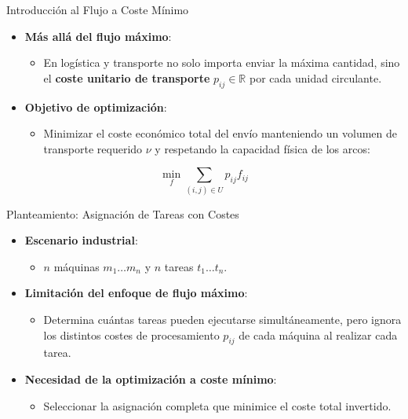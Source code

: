 \documentclass[
  ignorenonframetext,
]{beamer}
\providecommand{\tightlist}{%
  \setlength{\itemsep}{0pt}\setlength{\parskip}{0pt}}
\begin{document}
\begin{frame}{Introducción al Flujo a Coste Mínimo}
\label{introducciuxf3n-al-flujo-a-coste-muxednimo}
\begin{itemize}
\tightlist
\item
  \textbf{Más allá del flujo máximo}:

  \begin{itemize}
  \tightlist
  \item
    En logística y transporte no solo importa enviar la máxima cantidad,
    sino el \textbf{coste unitario de transporte}
    \(p_{ij} \in \mathbb{R}\) por cada unidad circulante.
  \end{itemize}
\item
  \textbf{Objetivo de optimización}:

  \begin{itemize}
  \tightlist
  \item
    Minimizar el coste económico total del envío manteniendo un volumen
    de transporte requerido \(\nu\) y respetando la capacidad física de
    los arcos:
  \end{itemize}
\end{itemize}

\[\min_{f} \sum_{(i,j) \in U} p_{ij} f_{ij}\]
\end{frame}

\begin{frame}{Planteamiento: Asignación de Tareas con Costes}
\label{planteamiento-asignaciuxf3n-de-tareas-con-costes}
\begin{itemize}
\tightlist
\item
  \textbf{Escenario industrial}:

  \begin{itemize}
  \tightlist
  \item
    \(n\) máquinas \(m_1 \dots m_n\) y \(n\) tareas \(t_1 \dots t_n\).
  \end{itemize}
\item
  \textbf{Limitación del enfoque de flujo máximo}:

  \begin{itemize}
  \tightlist
  \item
    Determina cuántas tareas pueden ejecutarse simultáneamente, pero
    ignora los distintos costes de procesamiento \(p_{ij}\) de cada
    máquina al realizar cada tarea.
  \end{itemize}
\item
  \textbf{Necesidad de la optimización a coste mínimo}:

  \begin{itemize}
  \tightlist
  \item
    Seleccionar la asignación completa que minimice el coste total
    invertido.
  \end{itemize}
\end{itemize}
\end{frame}
\end{document}
